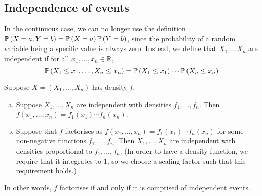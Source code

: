 \subsection{Independence of events}
In the continuous case, we can no longer use the definition \(\mathbb{P}\left({X = a, Y = b}\right) = \mathbb{P}\left({X = a}\right)\mathbb{P}\left({Y = b}\right)\), since the probability of a random variable being a specific value is always zero.
Instead, we define that \(X_1, \dots X_n\) are independent if for all \(x_1, \dots, x_n \in \mathbb R\),
\[
	\mathbb{P}\left({X_1 \leq x_1, \dots, X_n \leq x_n}\right) = \mathbb{P}\left({X_1 \leq x_1}\right)\cdots\mathbb{P}\left({X_n \leq x_n}\right)
\]
\begin{theorem}
	Suppose \(X = (X_1, \dots, X_n)\) has density \(f\).
	\begin{enumerate}[(a)]
		\item Suppose \(X_1, \dots, X_n\) are independent with densities \(f_1, \dots, f_n\).
		      Then \(f(x_1, \dots, x_n) = f_1(x_1)\cdots f_n(x_n)\).
		\item Suppose that \(f\) factorises as \(f(x_1, \dots, x_n) = f_1(x_1)\cdots f_n(x_n)\) for some non-negative functions \(f_1, \dots, f_n\).
		      Then \(X_1, \dots, X_n\) are independent with densities proportional to \(f_1, \dots, f_n\).
		      (In order to have a density function, we require that it integrates to 1, so we choose a scaling factor such that this requirement holds.)
	\end{enumerate}
	In other words, \(f\) factorises if and only if it is comprised of independent events.
\end{theorem}
